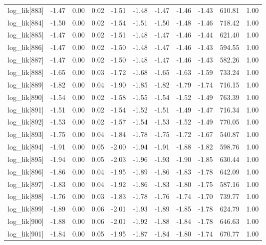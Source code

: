 \begin{table}[ht]
\begin{tabular}{rrrrrrrrrrr}
  log\_lik[883] & -1.47 & 0.00 & 0.02 & -1.51 & -1.48 & -1.47 & -1.46 & -1.43 & 610.81 & 1.00 \\ 
  log\_lik[884] & -1.50 & 0.00 & 0.02 & -1.54 & -1.51 & -1.50 & -1.48 & -1.46 & 718.42 & 1.00 \\ 
  log\_lik[885] & -1.47 & 0.00 & 0.02 & -1.51 & -1.48 & -1.47 & -1.46 & -1.44 & 621.40 & 1.00 \\ 
  log\_lik[886] & -1.47 & 0.00 & 0.02 & -1.50 & -1.48 & -1.47 & -1.46 & -1.43 & 594.55 & 1.00 \\ 
  log\_lik[887] & -1.47 & 0.00 & 0.02 & -1.50 & -1.48 & -1.47 & -1.46 & -1.43 & 582.26 & 1.00 \\ 
  log\_lik[888] & -1.65 & 0.00 & 0.03 & -1.72 & -1.68 & -1.65 & -1.63 & -1.59 & 733.24 & 1.00 \\ 
  log\_lik[889] & -1.82 & 0.00 & 0.04 & -1.90 & -1.85 & -1.82 & -1.79 & -1.74 & 716.15 & 1.00 \\ 
  log\_lik[890] & -1.54 & 0.00 & 0.02 & -1.58 & -1.55 & -1.54 & -1.52 & -1.49 & 763.39 & 1.00 \\ 
  log\_lik[891] & -1.51 & 0.00 & 0.02 & -1.54 & -1.52 & -1.51 & -1.49 & -1.47 & 716.34 & 1.00 \\ 
  log\_lik[892] & -1.53 & 0.00 & 0.02 & -1.57 & -1.54 & -1.53 & -1.52 & -1.49 & 770.05 & 1.00 \\ 
  log\_lik[893] & -1.75 & 0.00 & 0.04 & -1.84 & -1.78 & -1.75 & -1.72 & -1.67 & 540.87 & 1.00 \\ 
  log\_lik[894] & -1.91 & 0.00 & 0.05 & -2.00 & -1.94 & -1.91 & -1.88 & -1.82 & 598.76 & 1.00 \\ 
  log\_lik[895] & -1.94 & 0.00 & 0.05 & -2.03 & -1.96 & -1.93 & -1.90 & -1.85 & 630.44 & 1.00 \\ 
  log\_lik[896] & -1.86 & 0.00 & 0.04 & -1.95 & -1.89 & -1.86 & -1.83 & -1.78 & 642.09 & 1.00 \\ 
  log\_lik[897] & -1.83 & 0.00 & 0.04 & -1.92 & -1.86 & -1.83 & -1.80 & -1.75 & 587.16 & 1.00 \\ 
  log\_lik[898] & -1.76 & 0.00 & 0.03 & -1.83 & -1.78 & -1.76 & -1.74 & -1.70 & 739.77 & 1.00 \\ 
  log\_lik[899] & -1.89 & 0.00 & 0.06 & -2.01 & -1.93 & -1.89 & -1.85 & -1.78 & 624.79 & 1.00 \\ 
  log\_lik[900] & -1.88 & 0.00 & 0.06 & -2.01 & -1.92 & -1.88 & -1.84 & -1.78 & 646.63 & 1.00 \\ 
  log\_lik[901] & -1.84 & 0.00 & 0.05 & -1.95 & -1.87 & -1.84 & -1.80 & -1.74 & 670.77 & 1.00 \\ 

\end{tabular}
\end{table}
